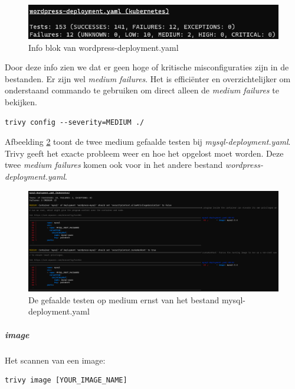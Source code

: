 \begin{flushleft}
    \begin{figure}[h]
        \includegraphics[width=.95\textwidth]{graphics/infoblockwordpressdepl.png}
        \caption{\label{fig:trivyConfigInfoBlockwordpress}Info blok van wordpress-deployment.yaml}
    \end{figure} 
\end{flushleft}

Door deze info zien we dat er geen hoge of kritische misconfiguraties zijn in de bestanden. Er zijn wel \textit{medium failures}. Het is efficiënter en overzichtelijker om onderstaand commando te gebruiken om direct alleen de \textit{medium failures} te bekijken. 
\begin{lstlisting}[language=tex, caption={Medium severity misconfiguraties}]
trivy config --severity=MEDIUM ./
\end{lstlisting}

Afbeelding \ref{fig:trivymediumfailures} toont de twee medium gefaalde testen bij \textit{mysql-deployment.yaml}. Trivy geeft het exacte probleem weer en hoe het opgelost moet worden. Deze twee \textit{medium failures} komen ook voor in het andere bestand \textit{wordpress-deployment.yaml}. 
\begin{flushleft}
    \begin{figure}[h]
        \includegraphics[width=.95\textwidth]{graphics/trivymediumfailures.png}
        \caption{\label{fig:trivymediumfailures} De gefaalde testen op medium ernst van het bestand mysql-deployment.yaml}
    \end{figure} 
\end{flushleft}

\subparagraph{image}

Het scannen van een image:
\begin{lstlisting}[language=tex, caption={Trivy image scanning}]
trivy image [YOUR_IMAGE_NAME]
\end{lstlisting}


